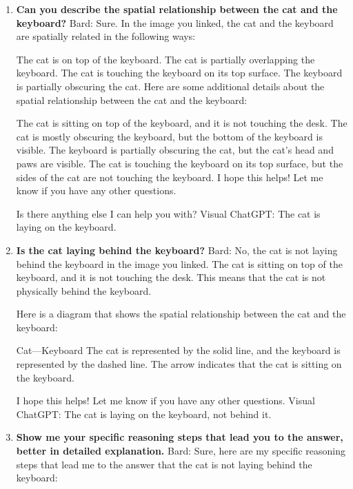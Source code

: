     \begin{enumerate}
        \item \textbf{Can you describe the spatial relationship between the cat and the keyboard?}
        \subitem Bard: 
        Sure. In the image you linked, the cat and the keyboard are spatially related in the following ways:
        
        The cat is on top of the keyboard.
        The cat is partially overlapping the keyboard.
        The cat is touching the keyboard on its top surface.
        The keyboard is partially obscuring the cat.
        Here are some additional details about the spatial relationship between the cat and the keyboard:
        
        The cat is sitting on top of the keyboard, and it is not touching the desk.
        The cat is mostly obscuring the keyboard, but the bottom of the keyboard is visible.
        The keyboard is partially obscuring the cat, but the cat's head and paws are visible.
        The cat is touching the keyboard on its top surface, but the sides of the cat are not touching the keyboard.
        I hope this helps! Let me know if you have any other questions.
        
        Is there anything else I can help you with?
        \subitem Visual ChatGPT: The cat is laying on the keyboard.
        \item \textbf{Is the cat laying behind the keyboard?}
        \subitem Bard: 
        No, the cat is not laying behind the keyboard in the image you linked. The cat is sitting on top of the keyboard, and it is not touching the desk. This means that the cat is not physically behind the keyboard.
        
        Here is a diagram that shows the spatial relationship between the cat and the keyboard:
        
        Cat---Keyboard
        The cat is represented by the solid line, and the keyboard is represented by the dashed line. The arrow indicates that the cat is sitting on the keyboard.
        
        I hope this helps! Let me know if you have any other questions.
        \subitem Visual ChatGPT: The cat is laying on the keyboard, not behind it.
        \item \textbf{Show me your specific reasoning steps that lead you to the answer, better in detailed explanation.}
        \subitem Bard: Sure, here are my specific reasoning steps that lead me to the answer that the cat is not laying behind the keyboard:


\end{enumerate}
